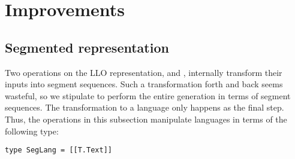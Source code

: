 \section{Improvements}
\label{sec:improvements}

\subsection{Segmented representation}
\label{sec:segm-repr}

Two operations on the LLO representation,  and
, internally transform their inputs into segment
sequences. Such a transformation forth and back seems wasteful, so we
stipulate to perform the entire generation in terms of segment
sequences. The transformation to a language only happens as the final
step. Thus, the operations in this subsection manipulate languages in
terms of the following type:
\begin{lstlisting}[numbers=none]
type SegLang = [[T.Text]]
\end{lstlisting}

